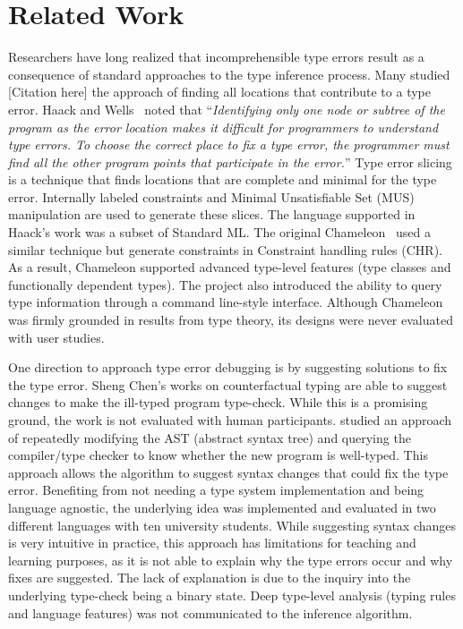 \section{Related Work}
Researchers have long realized that incomprehensible type errors result as a consequence of standard approaches to the type inference process. Many studied [Citation here] the approach of finding all locations that contribute to a type error. Haack and Wells~\cite{haack_type_2004} noted that ``\textit{Identifying only one node or subtree of the program as the error location makes it difficult for programmers to understand type errors. To choose the correct place to fix a type error, the programmer must find all the other program points that participate in the error.}''  Type error slicing~\cite{haack_type_2004} is a technique that finds locations that are complete and minimal for the type error. Internally labeled constraints and Minimal Unsatisfiable Set (MUS) manipulation are used to generate these slices. The language supported in Haack's work was a subset of Standard ML. The original Chameleon~\cite{stuckey_interactive_2003} used a similar technique but generate constraints in Constraint handling rules (CHR). As a result,  Chameleon supported advanced type-level features (type classes and functionally dependent types). The project also introduced the ability to query type information through a command line-style interface. Although Chameleon was firmly grounded in results from type theory, its designs were never evaluated with user studies.

One direction to approach type error debugging is by suggesting solutions to fix the type error. Sheng Chen's works \cite{chen_counter-factual_2014, chen_efficient_2020, chen_improving_2022} on counterfactual typing are able to suggest changes to make the ill-typed program type-check. While this is a promising ground, the work is not evaluated with human participants. \cite{lerner_searching_2007} studied an approach of repeatedly modifying the AST (abstract syntax tree) and querying the compiler/type checker to know whether the new program is well-typed. This approach allows the algorithm to suggest syntax changes that could fix the type error. Benefiting from not needing a type system implementation and being language agnostic, the underlying idea was implemented and evaluated in two different languages with ten university students. While suggesting syntax changes is very intuitive in practice, this approach has limitations for teaching and learning purposes, as it is not able to explain why the type errors occur and why fixes are suggested. The lack of explanation is due to the inquiry into the underlying type-check being a binary state. Deep type-level analysis (typing rules and language features) was not communicated to the inference algorithm.

